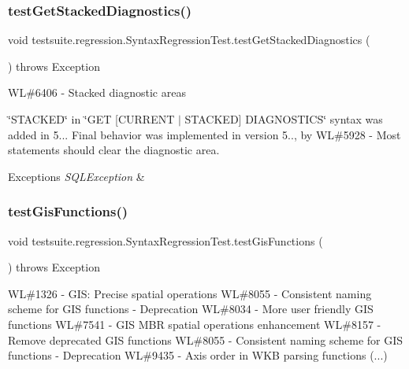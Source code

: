 \subsubsection{\texorpdfstring{test\+Get\+Stacked\+Diagnostics()}{testGetStackedDiagnostics()}}
{\footnotesize\ttfamily void testsuite.\+regression.\+Syntax\+Regression\+Test.\+test\+Get\+Stacked\+Diagnostics (\begin{DoxyParamCaption}{ }\end{DoxyParamCaption}) throws Exception}

WL\#6406 -\/ Stacked diagnostic areas

\char`\"{}\+S\+T\+A\+C\+K\+E\+D\char`\"{} in \char`\"{}\+G\+E\+T \mbox{[}\+C\+U\+R\+R\+E\+N\+T $\vert$ S\+T\+A\+C\+K\+E\+D\mbox{]} D\+I\+A\+G\+N\+O\+S\+T\+I\+C\+S\char`\"{} syntax was added in 5... Final behavior was implemented in version 5.., by WL\#5928 -\/ Most statements should clear the diagnostic area.


\begin{DoxyExceptions}{Exceptions}
{\em S\+Q\+L\+Exception} & \\
\hline
\end{DoxyExceptions}
\mbox{\label{classtestsuite_1_1regression_1_1_syntax_regression_test_a5093357371fd3056075bdda8c5853c9f}} 
\subsubsection{\texorpdfstring{test\+Gis\+Functions()}{testGisFunctions()}}
{\footnotesize\ttfamily void testsuite.\+regression.\+Syntax\+Regression\+Test.\+test\+Gis\+Functions (\begin{DoxyParamCaption}{ }\end{DoxyParamCaption}) throws Exception}

WL\#1326 -\/ G\+IS\+: Precise spatial operations WL\#8055 -\/ Consistent naming scheme for G\+IS functions -\/ Deprecation WL\#8034 -\/ More user friendly G\+IS functions WL\#7541 -\/ G\+IS M\+BR spatial operations enhancement WL\#8157 -\/ Remove deprecated G\+IS functions WL\#8055 -\/ Consistent naming scheme for G\+IS functions -\/ Deprecation WL\#9435 -\/ Axis order in W\+KB parsing functions (...)

